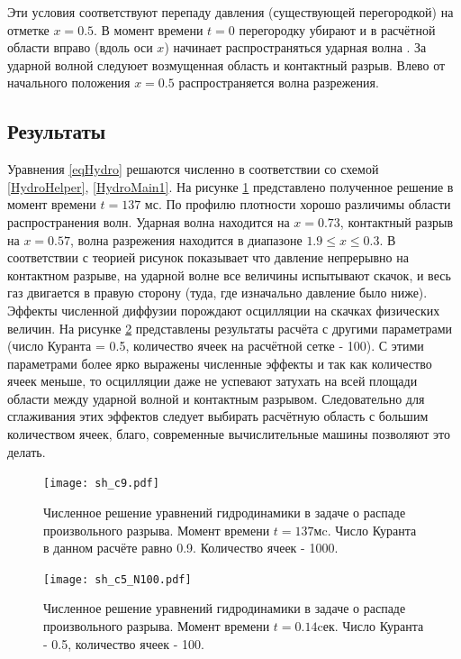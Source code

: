 \documentclass[a4paper]{article}
\begin{document}
	Эти условия соответствуют перепаду давления (существующей перегородкой) на отметке $x = 0.5$. В момент времени $t = 0$ перегородку убирают и в расчётной области вправо (вдоль оси $x$) начинает распространяться ударная волна \cite{Zeldobich}. За ударной волной следуюет возмущенная область и контактный разрыв. Влево от начального положения $x = 0.5$ распространяется волна разрежения.
	
	\newpage
	\subsection{Результаты}
	Уравнения \eqref{eqHydro} решаются численно в соответствии со схемой \eqref{HydroHelper}, \eqref{HydroMain1}. На рисунке \ref{ShockwavePlot} представлено полученное решение в момент времени $t = 137$ мс. По профилю плотности хорошо различимы области распространения волн. Ударная волна находится на $x = 0.73$, контактный разрыв на $x = 0.57$, волна разрежения находится в диапазоне $ 1.9 \leqslant x \leqslant 0.3 $. В соответствии с теорией \cite{Rozhd} рисунок показывает что давление непрерывно на контактном разрыве, на ударной волне все величины испытывают скачок, и весь газ двигается в правую сторону (туда, где изначально давление было ниже). Эффекты численной диффузии порождают осцилляции на скачках физических величин. На рисунке \ref{ShockwavePlot2} представлены результаты расчёта с другими параметрами (число Куранта = 0.5, количество ячеек на расчётной сетке - 100). С этими параметрами более ярко выражены численные эффекты и так как количество ячеек меньше, то осцилляции даже не успевают затухать на всей площади области между ударной волной и контактным разрывом. Следовательно для сглаживания этих эффектов следует выбирать расчётную область с большим количеством ячеек, благо, современные вычислительные машины позволяют это делать.
	
	\begin{figure}%
		\centering
		\texttt{[image: sh\_c9.pdf]}
		\caption{Численное решение уравнений гидродинамики в задаче о распаде произвольного разрыва. Момент времени $t = 137$мc. Число Куранта в данном расчёте равно 0.9. Количество ячеек - 1000.}
		\label{ShockwavePlot}
	\end{figure}

	\begin{figure}%
		\centering
		\texttt{[image: sh\_c5\_N100.pdf]}
		\caption{Численное решение уравнений гидродинамики в задаче о распаде произвольного разрыва. Момент времени $t = 0.14$cек. Число Куранта - 0.5, количество ячеек - 100.}
		\label{ShockwavePlot2}
	\end{figure}
	\newpage
\end{document}
